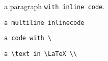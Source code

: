 a paragraph \texttt{with inline code}.

\texttt{a
multiline
inlinecode}

\texttt{a code with \textbackslash}

\texttt{a \textbackslash{}text in \textbackslash{}LaTeX \textbackslash{}\textbackslash{}}
